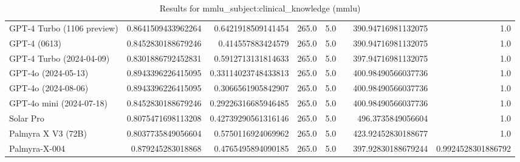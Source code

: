 \begin{table}[htp]
{\begin{tabular}{lrrrrrrr}
GPT-4 Turbo (1106 preview) & 0.8641509433962264 & 0.6421918509141454 & 265.0 & 5.0 &  & 390.94716981132075 & 1.0 \\
GPT-4 (0613) & 0.8452830188679246 & 0.414557883424579 & 265.0 & 5.0 &  & 390.94716981132075 & 1.0 \\
GPT-4 Turbo (2024-04-09) & 0.8301886792452831 & 0.5912713131814633 & 265.0 & 5.0 &  & 397.94716981132075 & 1.0 \\
GPT-4o (2024-05-13) & 0.8943396226415095 & 0.33114023748433813 & 265.0 & 5.0 &  & 400.98490566037736 & 1.0 \\
GPT-4o (2024-08-06) & 0.8943396226415095 & 0.3066561905842907 & 265.0 & 5.0 &  & 400.98490566037736 & 1.0 \\
GPT-4o mini (2024-07-18) & 0.8452830188679246 & 0.29226316685946485 & 265.0 & 5.0 &  & 400.98490566037736 & 1.0 \\
Solar Pro & 0.8075471698113208 & 0.42739290561316146 & 265.0 & 5.0 &  & 496.3735849056604 & 1.0 \\
Palmyra X V3 (72B) & 0.8037735849056604 & 0.5750116924069962 & 265.0 & 5.0 &  & 423.92452830188677 & 1.0 \\
Palmyra-X-004 & 0.879245283018868 & 0.4765495894090185 & 265.0 & 5.0 &  & 397.92830188679244 & 0.9924528301886792 \\
\bottomrule
\end{tabular}}
\caption{Results for mmlu_subject:clinical_knowledge (mmlu)}
\label{fig:mmlu_subject:clinical_knowledge (mmlu)}
\end{table}